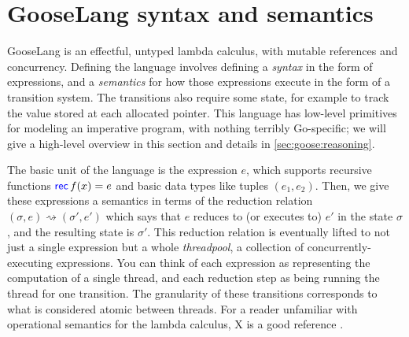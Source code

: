 \section{GooseLang syntax and semantics}%
\label{sec:goose:semantics}

\newcommand{\goosedef}[1]{\mathsf{#1}}
\newcommand{\goosekw}[1]{\goosedef{\textcolor{blue}{#1}}}
\newcommand{\app}{\:}
\newcommand{\binop}{\circledcirc}
\newcommand{\unop}{\circleddash}

\newcommand{\external}{\mathsf{\textcolor{red}{\langle External \rangle}}}

\newcommand{\gooseif}[3]{\goosekw{if} \app #1 \app%
  \goosekw{then} \app #2 \app \goosekw{else} \app #3}

\newcommand{\recfx}{\goosekw{rec} \, f(x) = e}
\newcommand{\gooselambda}[1]{\goosekw{\lambda}#1.\,}

\newcommand{\reduces}{\rightsquigarrow}
\newcommand{\purereduction}{\overset{\mathrm{pure}}{\reduces}}

\newcommand{\seq}{;\,}
\newcommand{\defeq}{\triangleq}

GooseLang is an effectful, untyped lambda calculus, with mutable references and
concurrency. Defining the language involves defining a \emph{syntax} in the form
of expressions, and a \emph{semantics} for how those expressions execute in the
form of a transition system. The transitions also require some state, for
example to track the value stored at each allocated pointer. This language has
low-level primitives for modeling an imperative program, with nothing terribly
Go-specific; we will give a high-level overview in this section and details in
\autoref{sec:goose:reasoning}.

The basic unit of the language is the expression $e$, which supports recursive
functions $\recfx$ and basic data types like tuples $(e_1, e_2)$. Then, we give
these expressions a semantics in terms of the reduction relation
$(\sigma, e) \reduces (\sigma', e')$ which says that $e$ reduces to (or executes
to) $e'$ in the state $\sigma$, and the resulting state is $\sigma'$. This
reduction relation is eventually lifted to not just a single expression but a
whole \emph{threadpool}, a collection of concurrently-executing expressions. You
can think of each expression as representing the computation of a single thread,
and each reduction step as being running the thread for one transition. The
granularity of these transitions corresponds to what is considered atomic
between threads. For a reader unfamiliar with operational semantics for the
lambda calculus, X is a good reference .

